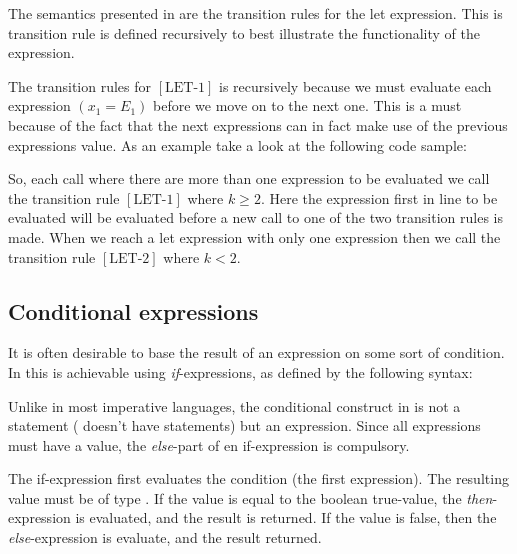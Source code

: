 The semantics presented in  are the transition rules for
the let expression.  This is transition rule is defined recursively to best
illustrate the functionality of the expression.




The transition rules for $[\mbox{LET-1}]$ is recursively because we must
evaluate each expression $(x_{1}=E_{1})$ before we move on to the next one. This
is a must because of the fact that the next expressions can in fact make use of
the previous expressions value. As an example take a look at the following code
sample:


So, each call where there are more than one expression to be evaluated we call
the transition rule $[\mbox{LET-1}]$ where $k \geq 2$. Here the expression first
in line to be evaluated will be evaluated before a new call to one of the two
transition rules is made. When we reach a let expression with only one
expression then we call the transition rule $[\mbox{LET-2}]$ where $k < 2$.

\subsection{Conditional expressions}
\label{sec:conditionalexpressions}

It is often desirable to base the result of an expression on some sort of condition.
In \productname{} this is achievable using \emph{if}-expressions, as defined by the
following syntax:

\begin{ebnf}
\end{ebnf}

Unlike in most imperative languages, the conditional construct in \productname{}
is not a statement (\productname{} doesn't have statements) but an expression.
Since all expressions must have a value, the \emph{else}-part of en
if-expression is compulsory.

The if-expression first evaluates the condition (the first expression). The
resulting value must be of type . If the value is equal to the
boolean true-value, the \emph{then}-expression is evaluated, and the result is
returned. If the value is false, then the \emph{else}-expression is evaluate,
and the result returned.

